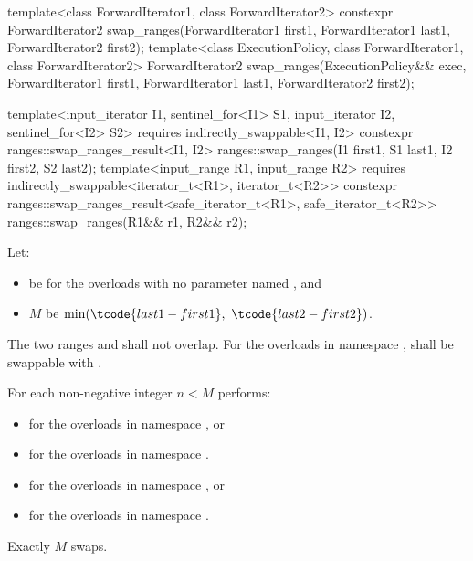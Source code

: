 %
\begin{itemdecl}
template<class ForwardIterator1, class ForwardIterator2>
  constexpr ForwardIterator2
    swap_ranges(ForwardIterator1 first1, ForwardIterator1 last1,
                ForwardIterator2 first2);
template<class ExecutionPolicy, class ForwardIterator1, class ForwardIterator2>
  ForwardIterator2
    swap_ranges(ExecutionPolicy&& exec,
                ForwardIterator1 first1, ForwardIterator1 last1,
                ForwardIterator2 first2);

template<input_iterator I1, sentinel_for<I1> S1, input_iterator I2, sentinel_for<I2> S2>
  requires indirectly_swappable<I1, I2>
  constexpr ranges::swap_ranges_result<I1, I2>
    ranges::swap_ranges(I1 first1, S1 last1, I2 first2, S2 last2);
template<input_range R1, input_range R2>
  requires indirectly_swappable<iterator_t<R1>, iterator_t<R2>>
  constexpr ranges::swap_ranges_result<safe_iterator_t<R1>, safe_iterator_t<R2>>
    ranges::swap_ranges(R1&& r1, R2&& r2);
\end{itemdecl}

\begin{itemdescr}
\pnum
Let:
\begin{itemize}
\item
   be 
  for the overloads with no parameter named , and
\item $M$ be $\min(\tcode{last1 - first1}, \ \tcode{last2 - first2})$.
\end{itemize}

\pnum
\requires
The two ranges  and 
shall not overlap.
For the overloads in namespace ,
 shall be swappable with
.

\pnum
\effects
For each non-negative integer $n < M$ performs:
\begin{itemize}
\item
  for the overloads in namespace , or
\item
  for the overloads in namespace .
\end{itemize}

\pnum
\returns
\begin{itemize}
\item
  for the overloads in namespace , or
\item
  for the overloads in namespace .
\end{itemize}

\pnum
\complexity
Exactly $M$ swaps.
\end{itemdescr}

